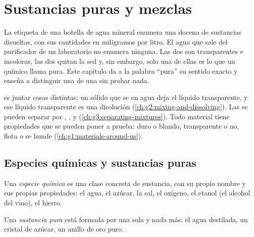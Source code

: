 \chapter{Sustancias puras y mezclas}\label{ch:g6:pure-substances-and-mixtures}

La etiqueta de una botella de agua mineral enumera una docena de
sustancias disueltas, con sus cantidades en miligramos por litro. El
agua que sale del purificador de un laboratorio no enumera ninguna. Las
dos son transparentes e incoloras, las dos quitan la sed y, sin embargo,
solo una de ellas es lo que un químico llama pura. Este capítulo da a la
palabra ``pura'' su sentido exacto y enseña a distinguir una  de una  sin probar nada.

\begin{recall}
 es juntar cosas distintas; un sólido que se  en agua
deja el líquido transparente, y ese líquido transparente es una
disolución (\cref{ch:g2:mixing-and-dissolving}). Las  se pueden
separar por , ,  y 
(\cref{ch:g3:separating-mixtures}). Todo material tiene propiedades que
se pueden poner a prueba: duro o blando, transparente o no, flota o se
hunde
(\cref{ch:g1:materials-around-us}).
\end{recall}

\section{Especies químicas y sustancias puras}

\begin{definition}\label{def:g6:pure-substances-and-mixtures:species}
Una \emph{especie química} es una clase
concreta de sustancia, con su propio nombre y sus propias propiedades:
el agua, el azúcar, la sal, el oxígeno, el etanol (el alcohol del vino),
el hierro.
\end{definition}

\begin{definition}\label{def:g6:pure-substances-and-mixtures:pure-substance}
Una \emph{sustancia pura} está formada por una
sola  y nada más: el agua destilada, un cristal de
azúcar, un anillo de oro puro.
\end{definition}

